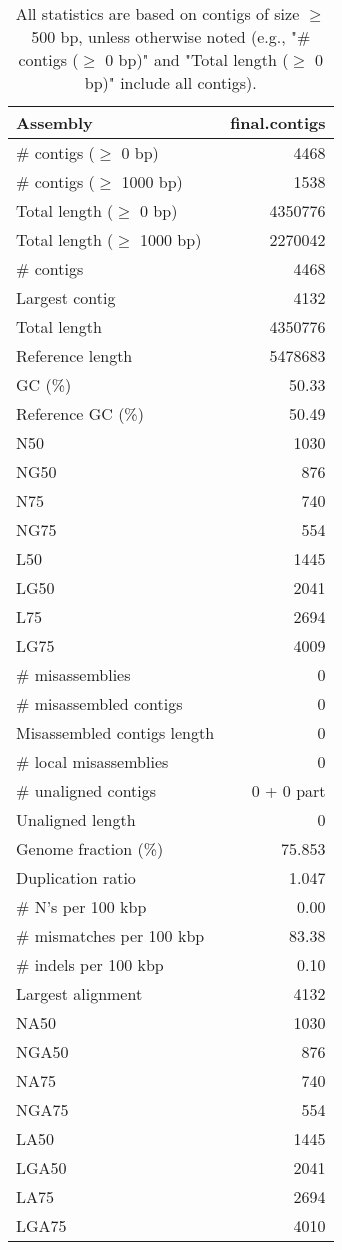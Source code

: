 \documentclass[12pt,a4paper]{article}
\begin{document}
\begin{table}[ht]
\begin{center}
\caption{All statistics are based on contigs of size $\geq$ 500 bp, unless otherwise noted (e.g., "\# contigs ($\geq$ 0 bp)" and "Total length ($\geq$ 0 bp)" include all contigs).}
\begin{tabular}{|l*{1}{|r}|}
\hline
Assembly & final.contigs \\ \hline
\# contigs ($\geq$ 0 bp) & 4468 \\ \hline
\# contigs ($\geq$ 1000 bp) & 1538 \\ \hline
Total length ($\geq$ 0 bp) & 4350776 \\ \hline
Total length ($\geq$ 1000 bp) & 2270042 \\ \hline
\# contigs & 4468 \\ \hline
Largest contig & 4132 \\ \hline
Total length & 4350776 \\ \hline
Reference length & 5478683 \\ \hline
GC (\%) & 50.33 \\ \hline
Reference GC (\%) & 50.49 \\ \hline
N50 & 1030 \\ \hline
NG50 & 876 \\ \hline
N75 & 740 \\ \hline
NG75 & 554 \\ \hline
L50 & 1445 \\ \hline
LG50 & 2041 \\ \hline
L75 & 2694 \\ \hline
LG75 & 4009 \\ \hline
\# misassemblies & 0 \\ \hline
\# misassembled contigs & 0 \\ \hline
Misassembled contigs length & 0 \\ \hline
\# local misassemblies & 0 \\ \hline
\# unaligned contigs & 0 + 0 part \\ \hline
Unaligned length & 0 \\ \hline
Genome fraction (\%) & 75.853 \\ \hline
Duplication ratio & 1.047 \\ \hline
\# N's per 100 kbp & 0.00 \\ \hline
\# mismatches per 100 kbp & 83.38 \\ \hline
\# indels per 100 kbp & 0.10 \\ \hline
Largest alignment & 4132 \\ \hline
NA50 & 1030 \\ \hline
NGA50 & 876 \\ \hline
NA75 & 740 \\ \hline
NGA75 & 554 \\ \hline
LA50 & 1445 \\ \hline
LGA50 & 2041 \\ \hline
LA75 & 2694 \\ \hline
LGA75 & 4010 \\ \hline
\end{tabular}
\end{center}
\end{table}
\end{document}

